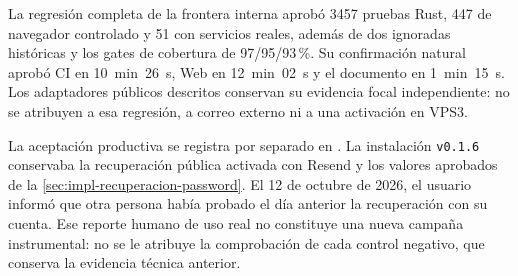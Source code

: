 La regresión completa de la frontera interna aprobó 3457 pruebas Rust,
447 de navegador controlado y 51 con servicios reales, además de dos ignoradas
históricas y los gates de cobertura de 97/95/93\,\%. Su confirmación natural
aprobó CI en 10~min~26~s, Web en 12~min~02~s y el documento en 1~min~15~s.
Los adaptadores públicos descritos conservan su evidencia focal independiente:
no se atribuyen a esa regresión, a correo externo ni a una activación en VPS3.

La aceptación productiva se registra por separado en
. La instalación \texttt{v0.1.6}
conservaba la recuperación pública activada con Resend y los valores aprobados
de la \cref{sec:impl-recuperacion-password}. El 12 de octubre de 2026, el
usuario informó que otra persona había probado el día anterior la recuperación
con su cuenta. Ese reporte humano de uso real no constituye una nueva
campaña instrumental: no se le atribuye la comprobación de cada control
negativo, que conserva la evidencia técnica anterior.
